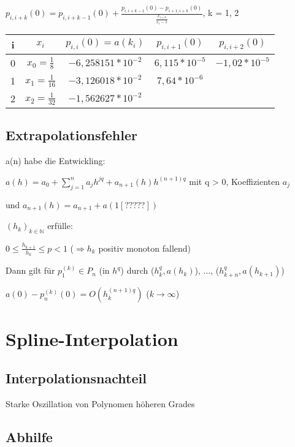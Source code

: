 \documentclass[12pt,a4paper]{article} %
\newcommand*\tab[1][1cm]{\hspace*{#1}}
\begin{document}
	$p_{i, i + k}(0) = p_{i, i + k - 1}(0) + \frac{p_{i, i + k - 1}(0) - p_{i + 1, i + k}(0)}{\frac{x_{i + k}}{x_i - 1}}$, k = 1, 2
	
	\begin{tabular}{ c | c | c | c | c }
		i & $x_i$ & $p_{i, i}(0) = a(k_i)$ & $p_{i, i + 1}(0)$ & $p_{i, i + 2}(0)$ \\ \hline
		0 & $x_0 = \frac{1}{8}$ & $-6,258151 * 10^{-2}$ & $6,115 * 10^{-5}$ & $-1,02 * 10^{-5}$ \\
		1 & $x_1 = \frac{1}{16}$ & $-3,126018 * 10^{-2}$ & $7,64 * 10^{-6}$ & \\
		2 & $x_2 = \frac{1}{32}$ & $-1,562627 * 10^{-2}$ & & 
	\end{tabular}

	\subsection{Extrapolationsfehler}
	
	a(n) habe die Entwickling:
	
	$a(h) = a_0 + \sum_{j = 1}^{n}a_jh^{jq} + a_{n + 1}(h)h^{(n+1)q}$ \tab mit q > 0,
	 Koeffizienten $a_j$ 
	 
	und $a_{n + 1}(h) = a_{n + 1} + a(1[?????])$
	
	$(h_k)_{k \in \mathbb{N}}$ erfülle:
	
	$0 \le \frac{h_{k + 1}}{h_k} \le p < 1$ ($\Rightarrow h_k$ positiv monoton fallend)
	
	Dann gilt für $p_1^{(k)} \in P_n$ (in $h^q$) durch ($h_k^q, a(h_k)$), ..., ($h_{k +n}^q, a(h_{k + 1})$)
	
	$a(0) - p_n^{(k)}(0) = O(h_k^{(n + 1)q})$ \tab ($k \rightarrow \infty$)
	
	\newpage
	
	\section{Spline-Interpolation}
	
	\subsection{Interpolationsnachteil}
	
	Starke Oszillation von Polynomen höheren Grades
	
	\subsection{Abhilfe}
	
\end{document}

